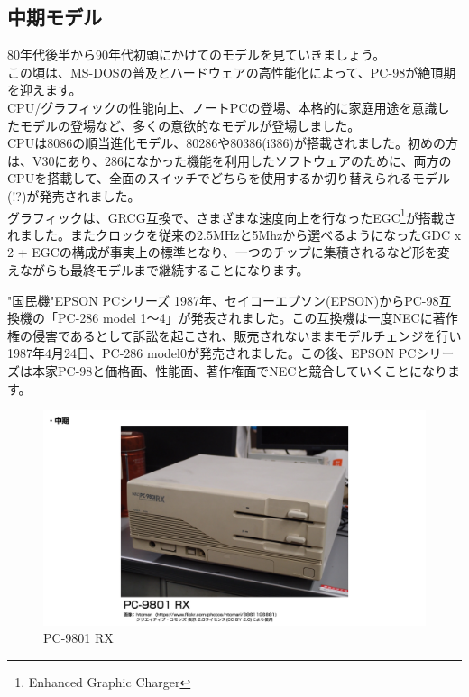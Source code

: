 \documentclass[b5paper,9pt,platex,dvipdfmx]{jsarticle}
\begin{document}
\begin{multicols}{3}
\subsection{中期モデル}
80年代後半から90年代初頭にかけてのモデルを見ていきましょう。\\
この頃は、MS-DOSの普及とハードウェアの高性能化によって、PC-98が絶頂期を迎えます。\\
CPU/グラフィックの性能向上、ノートPCの登場、本格的に家庭用途を意識したモデルの登場など、多くの意欲的なモデルが登場しました。\\
CPUは8086の順当進化モデル、80286や80386(i386)が搭載されました。初めの方は、V30にあり、286になかった機能を利用したソフトウェアのために、両方のCPUを搭載して、全面のスイッチでどちらを使用するか切り替えられるモデル(!?)が発売されました。\\
グラフィックは、GRCG互換で、さまざまな速度向上を行なったEGC\footnote{Enhanced Graphic Charger}が搭載されました。またクロックを従来の2.5MHzと5Mhzから選べるようになったGDC x 2 + EGCの構成が事実上の標準となり、一つのチップに集積されるなど形を変えながらも最終モデルまで継続することになります。\\

\begin{itembox}[l]{"国民機"EPSON PCシリーズ}
1987年、セイコーエプソン(EPSON)からPC-98互換機の「PC-286 model 1〜4」が発表されました。この互換機は一度NECに著作権の侵害であるとして訴訟を起こされ、販売されないままモデルチェンジを行い1987年4月24日、PC-286 model0が発売されました。この後、EPSON PCシリーズは本家PC-98と価格面、性能面、著作権面でNECと競合していくことになります。\\
\end{itembox}
\end{multicols}
\begin{figure}[H]
  \centering
  \includegraphics[width=12cm]{img-9.jpg}
  \caption{PC-9801 RX}
\end{figure}
\end{document}
